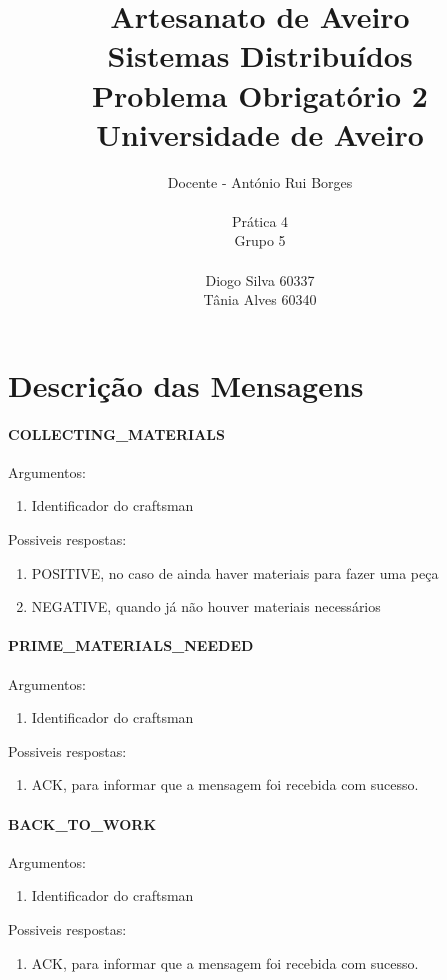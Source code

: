 \documentclass[11pt,a4paper]{report}
\title{\textbf{Artesanato de Aveiro} \\ 
\large{Sistemas Distribuídos\\ Problema Obrigatório 2}\\
\normalsize{Universidade de Aveiro}
}
\author{\normalsize{Docente - António Rui Borges}
\\
\\ Prática 4
\\ Grupo 5
\\
\\
\normalsize{Diogo Silva 60337} \\
\normalsize{Tânia Alves 60340} }
\begin{document}
\maketitle
\tableofcontents

\chapter{Descrição das Mensagens}

\subsubsection{COLLECTING\_MATERIALS}
Argumentos:
\begin{enumerate}
\itemsep-0.4em 
\item Identificador do craftsman
\end{enumerate}
Possiveis respostas: 
\begin{enumerate}
\itemsep-0.4em 
\item POSITIVE, no caso de ainda haver materiais para fazer uma peça
\item NEGATIVE, quando já não houver materiais necessários
\end{enumerate}

\subsubsection{PRIME\_MATERIALS\_NEEDED}
Argumentos:
\begin{enumerate}
\itemsep-0.4em 
\item Identificador do craftsman
\end{enumerate}
Possiveis respostas: 
\begin{enumerate}
\itemsep-0.4em 
\item ACK, para informar que a mensagem foi recebida com sucesso.
\end{enumerate}

\subsubsection{BACK\_TO\_WORK}
Argumentos:
\begin{enumerate}
\itemsep-0.4em 
\item Identificador do craftsman
\end{enumerate}
Possiveis respostas: 
\begin{enumerate}
\itemsep-0.4em 
\item ACK, para informar que a mensagem foi recebida com sucesso.
\end{enumerate}
\end{document}
